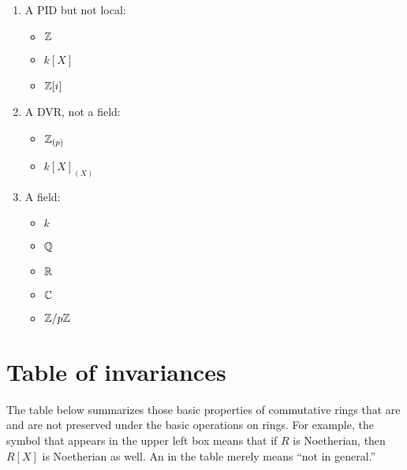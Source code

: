 \documentclass{ximera}
\begin{document}
\begin{enumerate}
\item A PID but not local: 
\begin{itemize}
\item $\mathbb Z$
\item $k[X]$
\item $\mathbb Z[i]$
\end{itemize}

\item A DVR, not a field:  
\begin{itemize}
\item $\mathbb Z_{(p)}$
\item $k[X]_{(X)}$
\end{itemize}


\item A field: 
\begin{itemize}
\item $k$
\item $\mathbb Q$
\item $\mathbb R$ 
\item $\mathbb C$ 
\item $\mathbb Z/p\mathbb Z$
\end{itemize}
\end{enumerate}



\section{Table of invariances}

The table below summarizes those basic properties of commutative rings
that are and are not preserved under the basic operations on rings.
For example, the symbol  that appears in the upper left box
means that if $R$ is Noetherian, then $R[X]$ is Noetherian as well.
An  in the table merely means ``not in general.''
\end{document}
